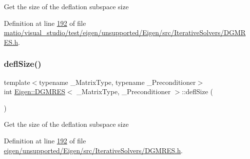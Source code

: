 Get the size of the deflation subspace size 

Definition at line \hyperlink{matio_2visual__studio_2test_2eigen_2unsupported_2_eigen_2src_2_iterative_solvers_2_d_g_m_r_e_s_8h_source_l00192}{192} of file \hyperlink{matio_2visual__studio_2test_2eigen_2unsupported_2_eigen_2src_2_iterative_solvers_2_d_g_m_r_e_s_8h_source}{matio/visual\+\_\+studio/test/eigen/unsupported/\+Eigen/src/\+Iterative\+Solvers/\+D\+G\+M\+R\+E\+S.\+h}.

\mbox{\label{class_eigen_1_1_d_g_m_r_e_s_a724f0f2f124376c3694fd69c59a88d5a}} 
\subsubsection{\texorpdfstring{defl\+Size()}{deflSize()}\hspace{0.1cm}{\footnotesize\ttfamily [2/2]}}
{\footnotesize\ttfamily template$<$typename \+\_\+\+Matrix\+Type, typename \+\_\+\+Preconditioner$>$ \\
int \hyperlink{class_eigen_1_1_d_g_m_r_e_s}{Eigen\+::\+D\+G\+M\+R\+ES}$<$ \+\_\+\+Matrix\+Type, \+\_\+\+Preconditioner $>$\+::defl\+Size (\begin{DoxyParamCaption}{ }\end{DoxyParamCaption})\hspace{0.3cm}{\ttfamily [inline]}}

Get the size of the deflation subspace size 

Definition at line \hyperlink{eigen_2unsupported_2_eigen_2src_2_iterative_solvers_2_d_g_m_r_e_s_8h_source_l00192}{192} of file \hyperlink{eigen_2unsupported_2_eigen_2src_2_iterative_solvers_2_d_g_m_r_e_s_8h_source}{eigen/unsupported/\+Eigen/src/\+Iterative\+Solvers/\+D\+G\+M\+R\+E\+S.\+h}.

\mbox{\label{class_eigen_1_1_d_g_m_r_e_s_a1b06062ec16932d3a20ea4767d9de51d}} 
